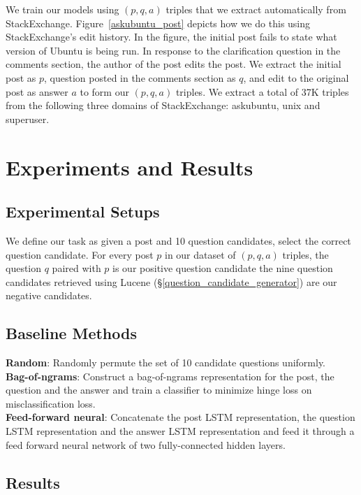 \documentclass[11pt,a4paper]{article}
\begin{document}
 We train our models using $(p,q,a)$ triples that we extract automatically from StackExchange.
Figure~\ref{askubuntu_post} depicts how we do this using StackExchange's edit history.  In the figure, the initial post fails to state what version of Ubuntu is being run. In response to the clarification question in the comments section, the author of the post edits the post. We extract the initial post as $p$, question posted in the comments section as $q$, and edit to the original post as answer $a$ to form our $(p,q,a)$ triples. We extract a total of 37K triples from the following three domains of StackExchange: askubuntu, unix and superuser.

\section{Experiments and Results}

\subsection{Experimental Setups}\label{task_setup}
We define our task as given a post and 10 question candidates, select the correct question candidate. For every post $p$ in our dataset of $(p, q, a)$ triples, the question $q$ paired with $p$ is our positive question candidate the nine question candidates retrieved using Lucene  (\S\ref{question_candidate_generator}) are our negative candidates.

\subsection{Baseline Methods}\label{baselines}

\textbf{Random}: Randomly permute the set of 10 candidate questions uniformly.\\
\textbf{Bag-of-ngrams}: Construct a bag-of-ngrams representation for the post, the question and the answer and train a classifier to minimize hinge loss on misclassification loss. \\
\textbf{Feed-forward neural}: Concatenate the post LSTM representation, the question LSTM representation and the answer LSTM representation and feed it through a feed forward neural network of two fully-connected hidden layers.

\subsection{Results}
\end{document}
